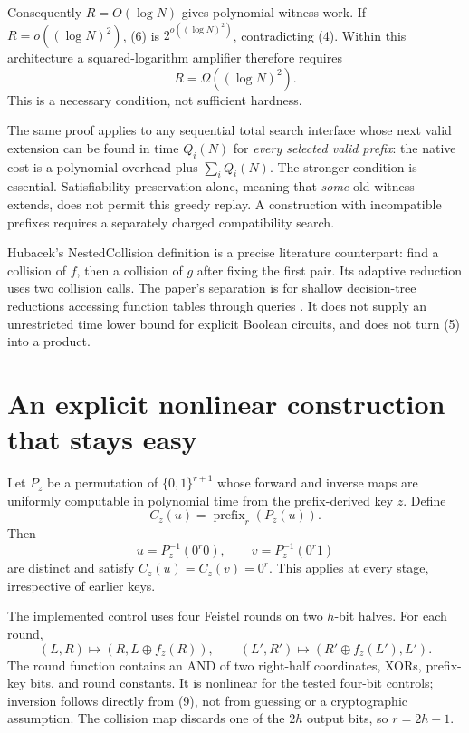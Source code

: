 \documentclass[11pt]{article}
\begin{document}
Consequently $R=O(\log N)$ gives polynomial witness work.
If $R=o((\log N)^2)$, (6) is
$2^{o((\log N)^2)}$, contradicting (4).
Within this architecture a squared-logarithm amplifier therefore requires
\[
 R=\Omega((\log N)^2).
 \tag{7}
\]
This is a necessary condition, not sufficient hardness.

The same proof applies to any sequential total search interface whose
next valid extension can be found in time $Q_i(N)$ for \emph{every
selected valid prefix}: the native cost is a polynomial overhead plus
$\sum_i Q_i(N)$. The stronger condition is essential.
Satisfiability preservation alone, meaning that \emph{some} old witness
extends, does not permit this greedy replay. A construction with
incompatible prefixes requires a separately charged compatibility search.

Hubacek's NestedCollision definition is a precise literature counterpart:
find a collision of $f$, then a collision of $g$ after fixing the first
pair. Its adaptive reduction uses two collision calls.
The paper's separation is for shallow decision-tree reductions accessing
function tables through queries \cite{hubacek2026}.
It does not supply an unrestricted time lower bound for explicit
Boolean circuits, and does not turn (5) into a product.

\section{An explicit nonlinear construction that stays easy}

Let $P_z$ be a permutation of $\{0,1\}^{r+1}$ whose forward and inverse
maps are uniformly computable in polynomial time from the prefix-derived
key $z$. Define
\[
 C_z(u)=\operatorname{prefix}_r(P_z(u)).
\]
Then
\[
 u=P_z^{-1}(0^r0),\qquad v=P_z^{-1}(0^r1)
 \tag{8}
\]
are distinct and satisfy $C_z(u)=C_z(v)=0^r$.
This applies at every stage, irrespective of earlier keys.

The implemented control uses four Feistel rounds on two $h$-bit halves.
For each round,
\[
 (L,R)\longmapsto(R,L\oplus f_z(R)),\qquad
 (L',R')\longmapsto(R'\oplus f_z(L'),L').
 \tag{9}
\]
The round function contains an AND of two right-half coordinates,
XORs, prefix-key bits, and round constants. It is nonlinear for the
tested four-bit controls; inversion follows directly from (9), not from
guessing or a cryptographic assumption. The collision map discards one
of the $2h$ output bits, so $r=2h-1$.
\end{document}
